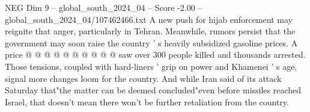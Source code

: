\begin{textsample}{NEG Dim 9 – global\_south\_2024\_04 – Score -2.00 – global\_south\_2024\_04/107462466.txt}
A new push for hijab enforcement may reignite that anger, particularly in Tehran.
Meanwhile, rumors persist that the government may soon raise the country ' s heavily subsidized gasoline prices.
A price @ @ @ @ @ @ @ @ @ @ saw over 300 people killed and thousands arrested.
Those tensions, coupled with hard-liners ' grip on power and Khamenei ' s age, signal more changes loom for the country.
And while Iran said of its attack Saturday that"the matter can be deemed concluded"even before missiles reached Israel, that doesn't mean there won't be further retaliation from the country.

\end{textsample}
